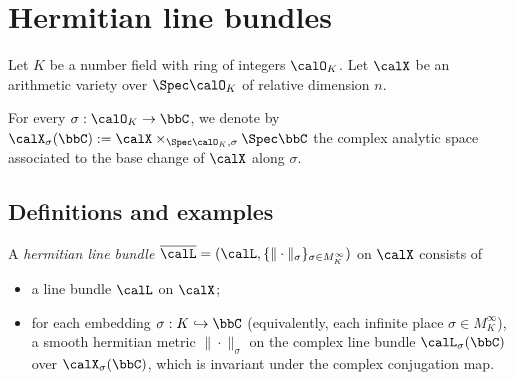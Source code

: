 \section{Hermitian line bundles}

Let \(K\) be a number field with ring of integers \(\calO_K\).
Let \(\calX\) be an arithmetic variety over \(\Spec \calO_K\) of relative dimension \(n\).

For every \(\sigma: \calO_K \to \bbC\), we denote by \(\calX_\sigma(\bbC) := \calX \times_{\Spec \calO_K, \sigma} \Spec \bbC\)
the complex analytic space associated to the base change of \(\calX\) along \(\sigma\).

\subsection{Definitions and examples}

    \begin{definition}\label{def:hermitian_line_bundles}
        A \emph{hermitian line bundle} \(\overline{\calL} = (\calL, \{\|\cdot\|_\sigma\}_{\sigma \in M_K^\infty})\) on \(\calX\) consists of
        \begin{itemize}
            \item a line bundle \(\calL\) on \(\calX\);
            \item for each embedding \(\sigma: K \hookrightarrow \bbC\) (equivalently, each infinite place \(\sigma \in M_K^\infty\)), 
                a smooth hermitian metric \(\|\cdot\|_\sigma\) on the complex line bundle \(\calL_\sigma(\bbC)\) over \(\calX_\sigma(\bbC)\), 
                which is invariant under the complex conjugation map.
        \end{itemize}
    \end{definition}

